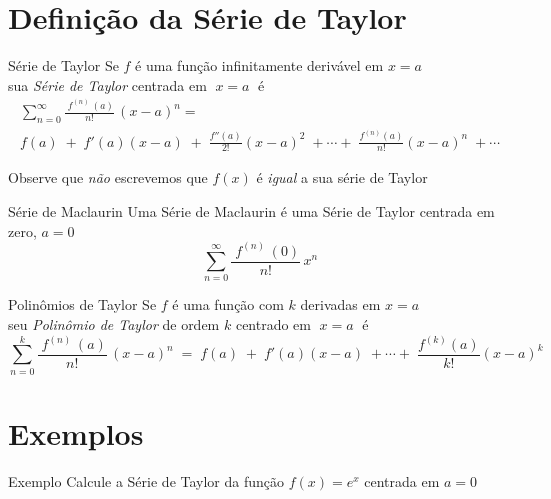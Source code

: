 \section{Definição da Série de Taylor}

\begin{frame}{Série de Taylor}
  Se $f$ é uma função infinitamente derivável em \(x=a\) \\
  sua \emph{Série de Taylor} centrada em $\;x=a\;$ é
  \begin{multline*}
    \sum_{n=0}^\infty \frac{\;f^{(n)\;}(a)}{n!}\,(x-a)^n = \\
    f(a)\;+\;f'(a)(x-a)\;+\;\frac{f''(a)}{2!}(x-a)^2\;+\cdots+\;\frac{f^{(n)}(a)}{n!}(x-a)^n\;+\cdots
  \end{multline*}

  \pause
  \vspace{\baselineskip}
  Observe que \emph{não} escrevemos que $f(x)$ é \emph{igual} a sua série de Taylor
\end{frame}

\begin{frame}{Série de Maclaurin}
  Uma Série de Maclaurin é uma Série de Taylor centrada em zero, $a=0$
  \[
    \sum_{n=0}^\infty \frac{\;f^{(n)\;}(0)}{n!}\,x^n
  \]
\end{frame}

\begin{frame}{Polinômios de Taylor}
  Se $f$ é uma função com $k$ derivadas em \(x=a\) \\
  seu \emph{Polinômio de Taylor} de ordem $k$ centrado em $\;x=a\;$ é
  \[
    \sum_{n=0}^k \frac{\;f^{(n)\;}(a)}{n!}\,(x-a)^n
      \;=\; f(a)
      \;+\;f'(a)(x-a)
      \;+\cdots+\; \frac{f^{(k)}(a)}{k!}(x-a)^k
    \]
\end{frame}

\section{Exemplos}

\addtocounter{exemplo}{1}
\begin{frame}{Exemplo \theexemplo}
  Calcule a Série de Taylor da função \emph{$f(x)=e^x$} centrada em \emph{$a=0$}
\end{frame}

